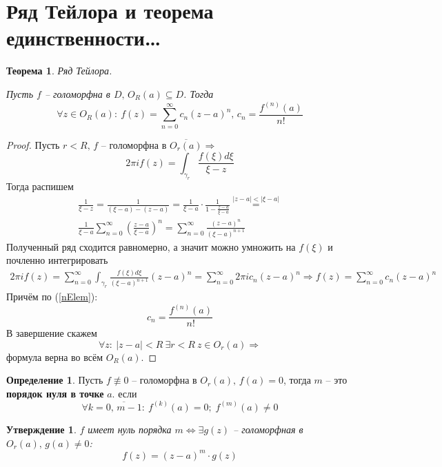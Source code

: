 \documentclass[a4paper,12pt]{article}
\theoremstyle{plain}
\newtheorem{theorem}{Теорема}[section]
\newtheorem{proposition}{Утверждение}[section]
\theoremstyle{definition}
\newtheorem{definition}{Определение}[section]
\theoremstyle{remark}
\begin{document}
\section{Ряд Тейлора и теорема единственности\dots}
\begin{theorem}\label{Taylor}
	Ряд Тейлора.

	Пусть $f$ -- голоморфна в $D,\, O_R(a) \subseteq D$. Тогда
	\[
		\forall z \in O_R(a) :\: f(z) = \sum_{n = 0}^\infty c_n(z - a)^n,\, c_n = \frac{f^{(n)}(a)}{n!}
	\]
\end{theorem}

\begin{proof}
	Пусть $r < R,\, f$ -- голоморфна в $\overline{O_r(a)} \Rightarrow$
	\[
		2\pi if(z) = \int_{\gamma_r}\frac{f(\xi)d\xi}{\xi - z}
	\]
	Тогда распишем
	\begin{align*}
		\frac{1}{\xi - z} = \frac{1}{(\xi - a) - (z - a)} = \frac{1}{\xi - a}\cdot\frac{1}{1 - \frac{z - a}{\xi - a}} \overset{\vert z - a\vert < \vert \xi - a\vert}{=} \\
		\frac{1}{\xi - a}\sum_{n = 0}^\infty \left(\frac{z - a}{\xi - a}\right)^n = \sum_{n = 0}^\infty \frac{(z - a)^n}{(\xi - a)^{n + 1}}
	\end{align*}
	Полученный ряд сходится равномерно, а значит можно умножить на $f(\xi)$ и почленно интегрировать
	\begin{align*}
		2\pi i f(z) = \sum_{n = 0}^\infty \int_{\gamma_r}\frac{f(\xi)d\xi}{(\xi - a)^{n + 1}}(z - a)^n = \sum_{n = 0}^\infty 2\pi i c_n(z - a)^n \Rightarrow f(z) = \sum_{n = 0}^\infty c_n(z - a)^n
	\end{align*}
	Причём по (\ref{nElem}):
	\[
		c_n = \frac{f^{(n)}(a)}{n!}
	\]
	В завершение скажем
	\[
		\forall z :\: \vert z - a\vert < R \: \exists r < R \: z \in O_r(a) \Rightarrow
	\]
	формула верна во всём $O_R(a)$.
\end{proof}

\begin{definition}
	Пусть $f \not\equiv 0$ -- голоморфна в $O_r(a),\, f(a) = 0$, тогда $m$ -- это \textbf{порядок нуля в точке} $a$. если
	\[
		\forall k = \overline{0,\, m - 1} :\: f^{(k)}(a) = 0;\; f^{(m)}(a) \neq 0
	\]
\end{definition}

\begin{proposition}
	$f$ имеет нуль порядка $m \Leftrightarrow \exists g(z)$ -- голоморфная в $O_r(a),\, g(a) \neq 0$:
	\[
		f(z) = (z - a)^m\cdot g(z)
	\]
\end{proposition}
\end{document}
